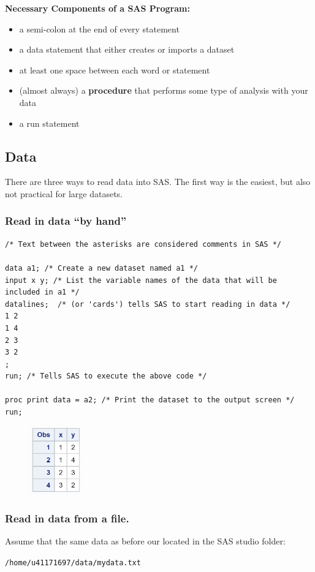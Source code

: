 \documentclass[12pt]{notes}
\begin{document}
\nspace
\textbf{Necessary Components of a SAS Program:}
\begin{itemize}
\item a semi-colon at the end of every statement 
\item a data statement that either creates or imports a dataset
\item at least one space between each word or statement
\item (almost always) a \textbf{procedure} that performs some type of analysis with your data
\item a run statement 
\end{itemize}

\subsection*{Data}
There are three ways to read data into SAS. The first way is the easiest, but also not practical for large datasets. 

\subsubsection*{Read in data ``by hand''}
\begin{verbatim}
/* Text between the asterisks are considered comments in SAS */

data a1; /* Create a new dataset named a1 */
input x y; /* List the variable names of the data that will be included in a1 */
datalines;  /* (or 'cards') tells SAS to start reading in data */
1 2
1 4
2 3
3 2
;
run; /* Tells SAS to execute the above code */

proc print data = a2; /* Print the dataset to the output screen */
run;
\end{verbatim}

\begin{figure}[H]
\centering
\includegraphics[width = 0.2\textwidth]{figures/module1/sas1.png}
\end{figure}

\subsubsection*{Read in data from a file.}
Assume that the same data as before our located in the SAS studio folder:
\begin{center}
\texttt{/home/u41171697/data/mydata.txt}
\end{center}
\end{document}
